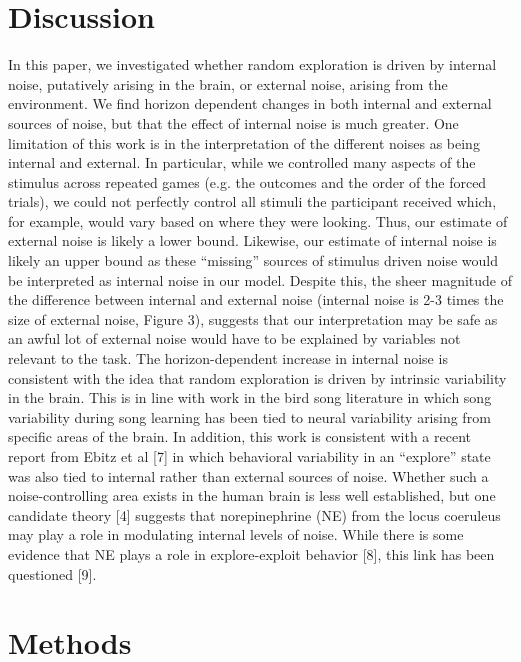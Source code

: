 \documentclass[12pt]{article}
\begin{document}
	\section*{Discussion}
	In this paper, we investigated whether random exploration is driven by internal noise, putatively arising in the brain, or external noise, arising from the environment.  We find horizon dependent changes in both internal and external sources of noise, but that the effect of internal noise is much greater. 
	One limitation of this work is in the interpretation of the different noises as being internal and external. In particular, while we controlled many aspects of the stimulus across repeated games (e.g. the outcomes and the order of the forced trials), we could not perfectly control all stimuli the participant received which, for example, would vary based on where they were looking.  Thus, our estimate of external noise is likely a lower bound. Likewise, our estimate of internal noise is likely an upper bound as these “missing” sources of stimulus driven noise would be interpreted as internal noise in our model. Despite this, the sheer magnitude of the difference between internal and external noise (internal noise is 2-3 times the size of external noise, Figure 3), suggests that our interpretation may be safe as an awful lot of external noise would have to be explained by variables not relevant to the task.  
	The horizon-dependent increase in internal noise is consistent with the idea that random exploration is driven by intrinsic variability in the brain. This is in line with work in the bird song literature in which song variability during song learning has been tied to neural variability arising from specific areas of the brain. In addition, this work is consistent with a recent report from Ebitz et al [7] in which behavioral variability in an “explore” state was also tied to internal rather than external sources of noise. Whether such a noise-controlling area exists in the human brain is less well established, but one candidate theory [4] suggests that norepinephrine (NE) from the locus coeruleus may play a role in modulating internal levels of noise.  While there is some evidence that NE plays a role in explore-exploit behavior [8], this link has been questioned [9].
	
	
	\section*{Methods}
\end{document}
